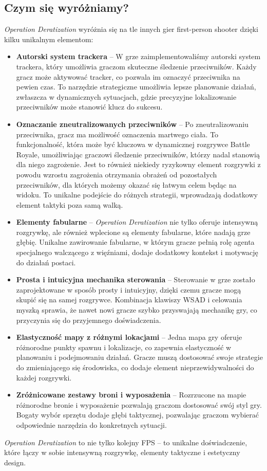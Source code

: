 \subsection{Czym się wyróżniamy?}
\textit{Operation Deratization} wyróżnia się na tle innych gier first-person shooter dzięki kilku unikalnym elementom:
\begin{itemize}
\item \textbf{Autorski system trackera} -- W grze zaimplementowaliśmy autorski system trackera, który umożliwia graczom skuteczne śledzenie przeciwników. Każdy gracz może aktywować tracker, co pozwala im oznaczyć przeciwnika na pewien czas. To narzędzie strategiczne umożliwia lepsze planowanie działań, zwłaszcza w dynamicznych sytuacjach, gdzie precyzyjne lokalizowanie przeciwników może stanowić klucz do sukcesu.
\item \textbf{Oznaczanie zneutralizowanych przeciwników} -- Po zneutralizowaniu przeciwnika, gracz ma możliwość oznaczenia martwego ciała. To funkcjonalność, która może być kluczowa w dynamicznej rozgrywce Battle Royale, umożliwiając graczowi śledzenie przeciwników, którzy nadal stanowią dla niego zagrożenie. Jest to również niekiedy ryzykowny element rozgrywki z powodu wzrostu zagrożenia otrzymania obrażeń od pozostałych przeciwników, dla których możemy okazać się łatwym celem będąc na widoku. To unikalne podejście do różnych strategii, wprowadzają dodatkowy element taktyki poza samą walką.
\item \textbf{Elementy fabularne} -- \textit{Operation Deratization} nie tylko oferuje intensywną rozgrywkę, ale również wplecione są elementy fabularne, które nadają grze głębię. Unikalne zawirowanie fabularne, w którym gracze pełnią rolę agenta specjalnego walczącego z więźniami, dodaje dodatkowy kontekst i motywację do działań postaci.
\item \textbf{Prosta i intuicyjna mechanika sterowania} -- Sterowanie w grze zostało zaprojektowane w sposób prosty i intuicyjny, dzięki czemu gracze mogą skupić się na samej rozgrywce. Kombinacja klawiszy WSAD i celowania myszką sprawia, że nawet nowi gracze szybko przyswajają mechanikę gry, co przyczynia się do przyjemnego doświadczenia.
\item \textbf{Elastyczność mapy z różnymi lokacjami} -- Jedna mapa gry oferuje różnorodne punkty spawnu i lokalizacje, co zapewnia elastyczność w planowaniu i podejmowaniu działań. Gracze muszą dostosować swoje strategie do zmieniającego się środowiska, co dodaje element nieprzewidywalności do każdej rozgrywki.
\item \textbf{Zróżnicowane zestawy broni i wyposażenia} -- Rozrzucone na mapie różnorodne bronie i wyposażenie pozwalają graczom dostosować swój styl gry. Bogaty wybór sprzętu dodaje głębi taktycznej, pozwalając graczom wybierać odpowiednie narzędzia do konkretnych sytuacji.
\end{itemize}
\textit{Operation Deratization} to nie tylko kolejny FPS – to unikalne doświadczenie, które łączy w sobie intensywną rozgrywkę, elementy taktyczne i estetyczny design.

